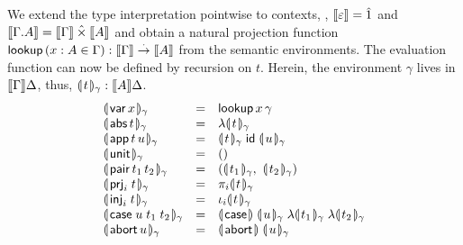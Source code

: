 \documentclass[sigplan,screen,fleqn]{acmart}
\begin{document}
We extend the type interpretation pointwise to contexts, \ie,
$\den \cempty = \hatone$ and
$\den{\cext \Gamma A} = \den \Gamma \hattimes \den A$
and obtain a natural projection function
$\tlookup\,(x : A \in \Gamma) : \den \Gamma \todot \den A$
from the semantic environments.
The evaluation function
can now be defined by recursion on $t$.
Herein, the environment $\gamma$ lives in $\den \Gamma \Delta$, thus, $\dent t \gamma : \den A \Delta$.
\[
\begin{array}{lcl}
  \dent{\tvar\,x}\gamma & = & \tlookup\,x\,\gamma \\
  \dent{\tabs\,t}\gamma & = & \fdent t \gamma \\
  \dent{\tapp\,t\,u} \gamma & = &
     \dent t \gamma\;\tid\;\dent u \gamma \\
  \dent{\tunit}\gamma & = & \ttempty \\
  \dent{\tpair\,t_1\,t_2}\gamma & = &
    (\dent{t_1}\gamma,\ \dent{t_2}\gamma) \\
  \dent{\prj i t}\gamma & = & \pi_i \dent t \gamma \\
  \dent{\inj i t}\gamma & = & \iota_i \dent t \gamma \\
  \dent{\tcase\;u\;t_1\;t_2}\gamma & = &
     \dencase\;\dent u \gamma\;\fdent{t_1}\gamma\;\fdent{t_2}\gamma \\
  \dent{\tabort\,u}\gamma & = & \denabort\;\dent u \gamma \\
\end{array}
\]
\end{document}
